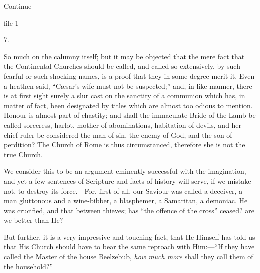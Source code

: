 Continue


file 1

7.

So much on the calumny itself; but it may be objected that the mere
fact that the Continental Churches should be called, and called so
extensively, by such fearful or such shocking names, is a proof that
they in some degree merit it. Even a heathen said, ``Cæsar's wife
must not be suspected;'' and, in like manner, there is at
first sight surely a slur cast on the sanctity of a communion which
has, in matter of fact, been designated by titles which are almost too
odious to mention. Honour is almost part of chastity; and shall the
immaculate Bride of the Lamb be called sorceress, harlot, mother of
abominations, habitation of devils, and her chief ruler be considered
the man of sin, the enemy of God, and the son of perdition? The Church
of Rome is thus circumstanced, therefore she is not the true Church.

We consider this to be an argument eminently successful with the
imagination, and yet a few sentences of Scripture and facts of history
will serve, if we mistake not, to destroy its force.—For, first of
all, our Saviour was called a deceiver, a man gluttonous and a
wine-bibber, a blasphemer, a Samaritan, a demoniac. He was crucified,
and that between thieves; has ``the offence of the cross''
ceased? are we better than He?

But further, it is a very impressive and touching fact, that He
Himself has told us that His Church should have to bear the same
reproach with Him:—``If they have called the Master of the house
Beelzebub, \emph{how much more} shall they call them of the
household?''

